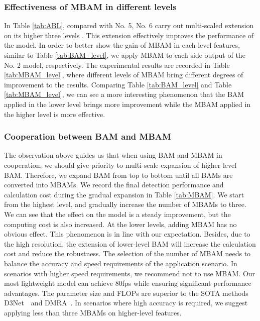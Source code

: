 \documentclass[journal]{IEEEtran}
\newcommand{\tabref}[1]{Table \ref{#1}}
\newcommand{\DMRA}{DMRA~\cite{piao2019depth}}
\newcommand{\DTNet}{D3Net~\cite{fan2019D3Net}}
\begin{document}
\subsubsection{Effectiveness of MBAM in different levels}
\label{sec:abl_mbam}
In \tabref{tab:ABL},
compared with No. 5, No. 6 carry out multi-scaled extension on its higher three levels .
This extension effectively improves the performance of the model.
In order to better show the gain of MBAM in each level features, similar to \tabref{tab:BAM_level}, 
we apply MBAM to each side output of the No. 2 model, respectively.
The experimental results are recorded in \tabref{tab:MBAM_level}, where
different levels of MBAM bring different degrees of improvement to the results.
Comparing \tabref{tab:BAM_level} and \tabref{tab:MBAM_level}, 
we can see a more interesting phenomenon that 
the BAM applied in the lower level brings more improvement 
while the MBAM applied in the higher level is more effective.

\subsubsection{Cooperation between BAM and MBAM}
The observation above guides us that when using BAM and MBAM in cooperation, 
we should give priority to multi-scale expansion of higher-level BAM.
Therefore, we expand BAM from top to bottom until all BAMs are converted into MBAMs.
We record the final detection performance and calculation cost during the gradual expansion in \tabref{tab:MBAM}.
We start from the highest level,
and gradually increase the number of MBAMs to three.
We can see that the effect on the model is a steady improvement, but the computing cost is also increased.
At the lower levels, adding MBAM has no obvious effect.
This phenomenon is in line with our expectation.
Besides, due to the high resolution, 
the extension of lower-level BAM will increase the calculation cost and reduce the robustness.
The selection of the number of MBAM needs to balance the accuracy and speed requirements of the application scenario.
In scenarios with higher speed requirements, we recommend not to use MBAM. 
Our most lightweight model can achieve 80fps while ensuring significant performance advantages.
The parameter size and FLOPs are superior to the SOTA methods \DTNet~and \DMRA.
In scenarios where high accuracy is required, we suggest applying less than three MBAMs on higher-level features.
\end{document}
